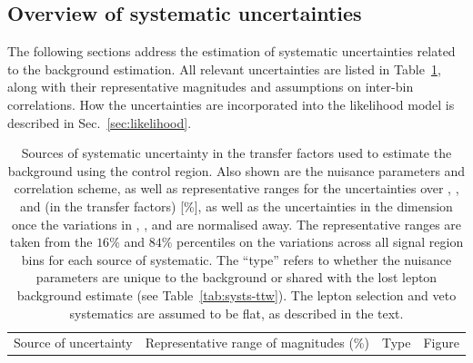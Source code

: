 \subsection{Overview of systematic uncertainties}
\label{sec:systematics-zinv}

The following sections address the estimation of systematic
uncertainties related to the \znunuj background estimation. All
relevant uncertainties are listed in Table~\ref{tab:systs-zinv}, along
with their representative magnitudes and assumptions on inter-bin
correlations. How the uncertainties are incorporated into the
likelihood model is described in Sec.~\ref{sec:likelihood}.

\begin{table}[h!]
  \caption{Sources of systematic uncertainty in the transfer factors
    used to estimate the \znunuj background using the \mmj control
    region. Also shown are the nuisance parameters and correlation
    scheme, as well as representative ranges for the uncertainties
    over \njet, \nb, and \scalht (\ie in the transfer factors) [\%],
    as well as the uncertainties in the \mht dimension once the
    variations in \njet, \nb, and \scalht are normalised away. The
    representative ranges are taken from the $16\%$ and $84\%$
    percentiles on the variations across all signal region bins for
    each source of systematic. The ``type'' refers to whether the
    nuisance parameters are unique to the \znunuj background  
    or shared with the lost lepton background estimate
    (see Table~\ref{tab:systs-ttw}). The lepton selection and veto
    systematics are assumed to be flat, as described in the text. 
  }
  \label{tab:systs-zinv}
  \centering
  \fontsize{8}{9.6}\selectfont
  \newcommand{\cat}{\njet, \scalht, \nb, \mht}
  \begin{tabular}{ llllc }
    \hline
    Source of uncertainty               & \multicolumn{2}{c}{Representative range of magnitudes (\%)} & Type & Figure \\


\end{tabular}
\end{table}
